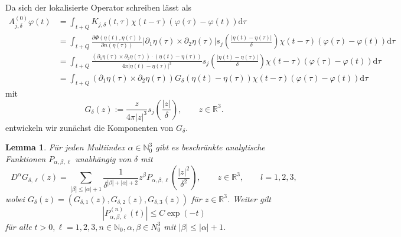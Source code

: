 \documentclass[12pt,a4paper]{scrartcl}
\newtheorem{Lemma}[Satz]{Lemma}
\newcommand{\dd}{\mathrm{d}}
\numberwithin{equation}{section}
\newcommand{\R}{\mathbb{R}} %
\newcommand{\N}{\mathbb{N}} %
\begin{document}
Da sich der lokalisierte Operator schreiben lässt als
\begin{align*}
A^{(0)}_{j,\delta}\varphi(t) & =\int_{t+Q} K_{j,\delta}(t,\tau)\chi(t-\tau)(\varphi(\tau)- \varphi(t)) \dd \tau \\
&=\int_{t+Q}\frac{\partial \Phi(\eta(t),\eta(\tau))}{\partial n (\eta(\tau))}|\partial_1 \eta (\tau) \times \partial_2 \eta(\tau)|s_j \left(\frac{|\eta(t)-\eta(\tau)|}{\delta}\right)\chi(t-\tau)(\varphi(\tau)- \varphi(t)) \dd \tau \\
&=\int_{t+Q}\frac{(\partial_1 \eta (\tau) \times \partial_2 \eta(\tau))\cdot (\eta(t)-\eta(\tau))}{4 \pi |\eta(t)-\eta(\tau)|^3}s_j \left(\frac{|\eta(t)-\eta(\tau)|}{\delta}\right)\chi(t-\tau)(\varphi(\tau)- \varphi(t)) \dd \tau \\
&=\int_{t+Q}(\partial_1 \eta (\tau) \times \partial_2 \eta(\tau)) G_\delta(\eta(t)-\eta(\tau)) \chi(t-\tau)(\varphi(\tau)- \varphi(t)) \dd \tau
\end{align*}
mit 
\[
G_\delta(z) := \frac{z}{4 \pi |z|^3}s_j\left(\frac{|z|}{\delta}\right), \qquad z \in \R^3.
\]
 entwickeln wir zunächst die Komponenten von $G_\delta$. 
\begin{Lemma} \label{LDa}
Für jeden Multiindex $\alpha \in \N_0^3$ gibt es beschränkte analytische Funktionen $P_{\alpha,\beta,\ell}$ unabhängig von $\delta$ mit
\[
D^\alpha G_{\delta,\ell}(z) = \sum_{|\beta|\leq |\alpha|+1}\frac{1}{\delta^{|\beta|+|\alpha|+2}}z^\beta P_{\alpha,\beta,\ell} \left(\frac{|z|^2}{\delta^2}\right), \qquad z\in\R^3, \qquad l=1,2,3,
\] wobei $G_\delta(z) = (G_{\delta,1}(z),G_{\delta,2}(z),G_{\delta,3}(z))$ für $z\in\R^3$. Weiter gilt \[|P_{\alpha,\beta,\ell}^{(n)}(t)|\leq C \exp(-t)\] für alle $t>0,\ell=1,2,3, n \in \N_0,\alpha,\beta \in N_0^3$ mit $|\beta|\leq|\alpha|+1$. 
\end{Lemma}
\end{document}
